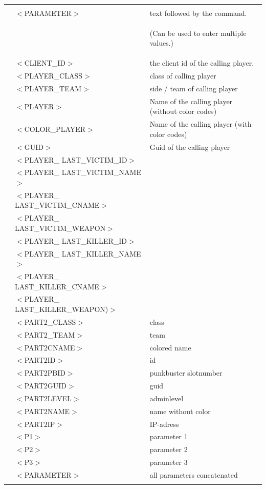 \documentclass[12pt,a4paper]{article}
\begin{document}
\begin{table}[h]\footnotesize
\begin{tabular}{l l|l}
\hline & & \\
 & $<$PARAMETER$>$					& text followed by the command.  \\
 && \begin{small}
(Can be used to enter multiple values.)
\end{small} \\
 & $<$CLIENT\_ID$>$					& the client id of the calling player.\\
 & $<$PLAYER\_CLASS$>$ 				& class of calling player\\
 & $<$PLAYER\_TEAM$>$ 				& side / team of calling player \\
 & $<$PLAYER$>$						& Name of the calling player (without color codes)\\
 & $<$COLOR\_PLAYER$>$				& Name of the calling player (with color codes)\\
 & $<$GUID$>$						& Guid of the calling player\\
 
 & $<$PLAYER\_ LAST\_VICTIM\_ID$>$ 		& 		\\
 & $<$PLAYER\_ LAST\_VICTIM\_NAME$>$ 	&		\\
 & $<$PLAYER\_ LAST\_VICTIM\_CNAME$>$ 	&		\\
 & $<$PLAYER\_ LAST\_VICTIM\_WEAPON$>$ 	&		\\

 & $<$PLAYER\_ LAST\_KILLER\_ID$>$ 		&		\\ 
 & $<$PLAYER\_ LAST\_KILLER\_NAME$>$ 	& 		\\ 
 & $<$PLAYER\_ LAST\_KILLER\_CNAME$>$ 	& 		\\ 
 & $<$PLAYER\_ LAST\_KILLER\_WEAPON)$>$ & 		\\ 
 
 & $<$PART2\_CLASS$>$					& class				\\
 & $<$PART2\_TEAM$>$ 					& team				\\
 & $<$PART2CNAME$>$						& colored name		\\
 & $<$PART2ID$>$						& id				\\
 & $<$PART2PBID$>$						& punkbuster slotnumber\\
 & $<$PART2GUID$>$						& guid				\\
 & $<$PART2LEVEL$>$						& adminlevel		\\
 & $<$PART2NAME$>$						& name without color\\
 & $<$PART2IP$>$						& IP-adress			 \\


 & $<$P1$>$								& parameter 1	 \\
 & $<$P2$>$								& parameter 2	\\	
 & $<$P3$>$								& parameter 3\\
 & $<$PARAMETER$>$						& all parameters concatenated\\

 & &  \\
 \hline
\end{tabular}
\end{table}
\end{document}
